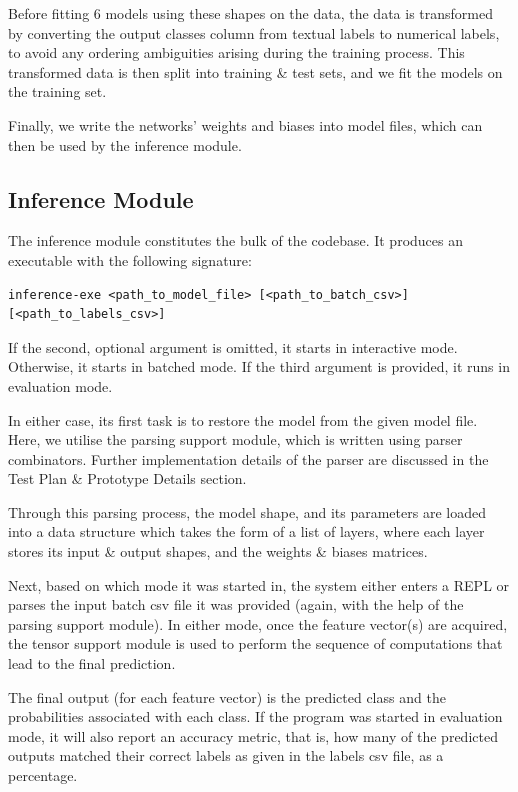 \documentclass[12pt, titlepage]{article}
\begin{document}
Before fitting 6 models using these shapes on the data, the data is transformed by converting the output classes column from textual labels to numerical labels, to avoid any ordering ambiguities arising during the training process. This transformed data is then split into training \& test sets, and we fit the models on the training set.\bigskip

Finally, we write the networks' weights and biases into model files, which can then be used by the inference module.

\subsection{Inference Module}
The inference module constitutes the bulk of the codebase. It produces an executable with the following signature:
\begin{verbatim}
inference-exe <path_to_model_file> [<path_to_batch_csv>] [<path_to_labels_csv>]
\end{verbatim}
If the second, optional argument is omitted, it starts in interactive mode. Otherwise, it starts in batched mode. If the third argument is provided, it runs in evaluation mode.\bigskip

In either case, its first task is to restore the model from the given model file. Here, we utilise the parsing support module, which is written using parser combinators. Further implementation details of the parser are discussed in the Test Plan \& Prototype Details section. \bigskip

Through this parsing process, the model shape, and its parameters are loaded into a data structure which takes the form of a list of layers, where each layer stores its input \& output shapes, and the weights \& biases matrices.\bigskip

Next, based on which mode it was started in, the system either enters a REPL or parses the input batch csv file it was provided (again, with the help of the parsing support module). In either mode, once the feature vector(s) are acquired, the tensor support module is used to perform the sequence of computations that lead to the final prediction.\bigskip

The final output (for each feature vector) is the predicted class and the probabilities associated with each class. If the program was started in evaluation mode, it will also report an accuracy metric, that is, how many of the predicted outputs matched their correct labels as given in the labels csv file, as a percentage.
\end{document}
